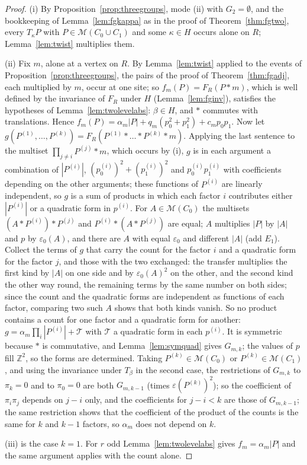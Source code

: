 \begin{proof}
(i) By Proposition~\ref{prop:threegroups}, mode (ii) with $G_2=\emptyset$, and the bookkeeping of Lemma~\ref{lem:fgkappa} as in the proof of Theorem~\ref{thm:fgtwo}, every $T_\kappa P$ with $P\in\mathcal{M}(C_0\cup C_1)$ and some $\kappa\in H$ occurs alone on $R$; Lemma~\ref{lem:twist} multiplies them.

(ii) Fix $m$, alone at a vertex on $R$. By Lemma~\ref{lem:twist} applied to the events of Proposition~\ref{prop:threegroups}, the pairs of the proof of Theorem~\ref{thm:fgadj}, each multiplied by $m$, occur at one site; so $f_m(P)=F_R(P*m)$, which is well defined by the invariance of $F_R$ under $H$ (Lemma~\ref{lem:fginv}), satisfies the hypotheses of Lemma~\ref{lem:twolevelabs}: $\beta\in H$, and $*$ commutes with translations. Hence $f_m(P)=\alpha_m|P|+q_m(p_0^{2}+p_1^{2})+c_mp_0p_1$. Now let $g(P^{(1)},\dots,P^{(k)})=F_R(P^{(1)}*\dots*P^{(k)}*m)$. Applying the last sentence to the multiset $\prod_{j\ne i}P^{(j)}*m$, which occurs by (i), $g$ is in each argument a combination of $|P^{(i)}|$, $(p^{(i)}_0)^{2}+(p^{(i)}_1)^{2}$ and $p^{(i)}_0p^{(i)}_1$ with coefficients depending on the other arguments; these functions of $P^{(i)}$ are linearly independent, so $g$ is a sum of products in which each factor $i$ contributes either $|P^{(i)}|$ or a quadratic form in $p^{(i)}$. For $A\in\mathcal{M}(C_0)$ the multisets $(A*P^{(i)})*P^{(j)}$ and $P^{(i)}*(A*P^{(j)})$ are equal; $A$ multiplies $|P|$ by $|A|$ and $p$ by $\varepsilon_0(A)$, and there are $A$ with equal $\varepsilon_0$ and different $|A|$ (add $E_1$). Collect the terms of $g$ that carry the count for the factor $i$ and a quadratic form for the factor $j$, and those with the two exchanged: the transfer multiplies the first kind by $|A|$ on one side and by $\varepsilon_0(A)^{2}$ on the other, and the second kind the other way round, the remaining terms by the same number on both sides; since the count and the quadratic forms are independent as functions of each factor, comparing two such $A$ shows that both kinds vanish. So no product contains a count for one factor and a quadratic form for another: $g=\alpha_m\prod_i|P^{(i)}|+\mathcal{T}$ with $\mathcal{T}$ a quadratic form in each $p^{(i)}$. It is symmetric because $*$ is commutative, and Lemma~\ref{lem:symquad} gives $G_{m,k}$; the values of $p$ fill $\mathbb{Z}^{2}$, so the forms are determined. Taking $P^{(k)}\in\mathcal{M}(C_0)$ or $P^{(k)}\in\mathcal{M}(C_1)$, and using the invariance under $T_\beta$ in the second case, the restrictions of $G_{m,k}$ to $\pi_k=0$ and to $\pi_0=0$ are both $G_{m,k-1}$ (times $\varepsilon(P^{(k)})^{2}$); so the coefficient of $\pi_i\pi_j$ depends on $j-i$ only, and the coefficients for $j-i<k$ are those of $G_{m,k-1}$; the same restriction shows that the coefficient of the product of the counts is the same for $k$ and $k-1$ factors, so $\alpha_m$ does not depend on $k$.

(iii) is the case $k=1$. For $r$ odd Lemma~\ref{lem:twolevelabs} gives $f_m=\alpha_m|P|$ and the same argument applies with the count alone.
\end{proof}

